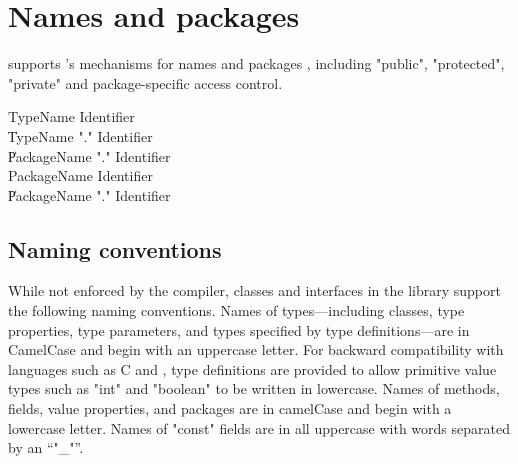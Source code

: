\chapter{Names and packages}
\label{packages} 

\Xten{} supports \java's mechanisms for names and packages \cite[\S
6,\S 7]{jls2}, including \xcd"public", \xcd"protected", \xcd"private"
and package-specific access control.

\begin{grammar}
TypeName   \: Identifier \\
        \| TypeName \xcd"." Identifier \\
        \| PackageName \xcd"." Identifier \\
PackageName   \: Identifier \\
        \| PackageName \xcd"." Identifier \\
\end{grammar}


\section{Naming conventions}

While not enforced by the compiler, classes and interfaces
in the \Xten{} library support the following naming conventions.
Names of types---including classes,
\iftypeparams\else
type properties,
\fi
type
parameters, and types specified by type definitions---are in
CamelCase and begin with an uppercase letter.  For backward
compatibility with languages such as C and \java{}, type
definitions are provided to allow primitive value types
such as \xcd"int" and \xcd"boolean" to be written in lowercase.
Names of methods, fields, value properties, and packages are in camelCase and begin with a lowercase letter.
Names of \xcd"const" fields are in all uppercase with words
separated by an ``\xcd"_"''.


